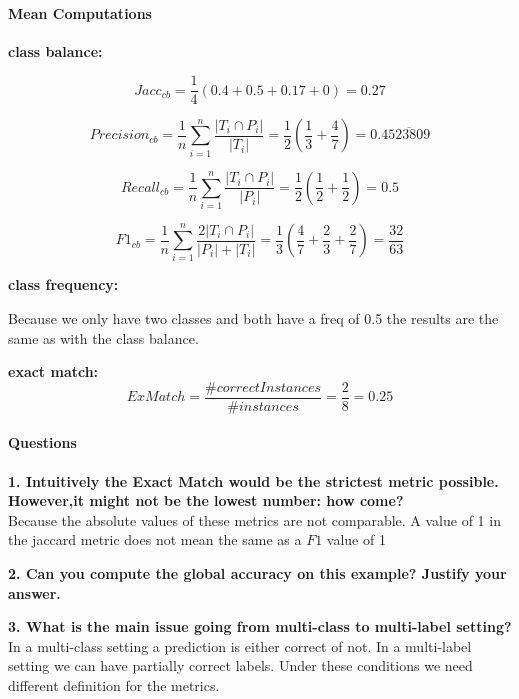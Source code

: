 \documentclass[10pt]{article}
\begin{document}
\paragraph{Mean Computations\\}

\textbf{class balance:}


 $$Jacc_{cb} = \frac{1}{4}\left(0.4+0.5+0.17+0\right)= 0.27$$
 
$$Precision_{cb} =\frac{1}{n}\sum_{i=1}^{n} \frac{|{T_i}\cap{P_i}|}{|T_i|}= \frac{1}{2}\left(\frac{1}{3}+\frac{4}{7}\right) = 0.4\overline{523809}$$

$$Recall_{cb} =\frac{1}{n}\sum_{i=1}^{n} \frac{|{T_i}\cap{P_i}|}{|P_i|} = \frac{1}{2} \left(\frac{1}{2} + \frac{1}{2}\right) = 0.5$$
 
$$F1_{cb} =\frac{1}{n}\sum_{i=1}^{n} \frac{2|{T_i}\cap{P_i}|}{|P_i|+|T_i|} = \frac{1}{3}\left(\frac{4}{7}+\frac{2}{3}+\frac{2}{7}\right) =\frac{32}{63} $$

\textbf{class frequency:}

Because we only have two classes and both have a freq of 0.5 the results are the same as with the class balance.

\textbf{exact match:}
$$ ExMatch = \frac{\#correct Instances}{\# instances} = \frac{2}{8} = 0.25 $$

\paragraph{Questions\\}

\textbf{1. Intuitively the Exact Match would be the strictest metric possible. However,it might not be the lowest number: how come?\\}
Because the absolute values of these metrics are not comparable. A value of 1 in the jaccard metric does not mean the same as a $F1$ value of 1

\textbf{2. Can you compute the global accuracy on this example? Justify your answer.\\}

\textbf{3. What is the main issue going from multi-class to multi-label setting?\\}
In a multi-class setting a prediction is either  correct of not. In a multi-label setting we can have partially correct labels. Under these conditions we need different definition for the metrics.

   
\end{document}
